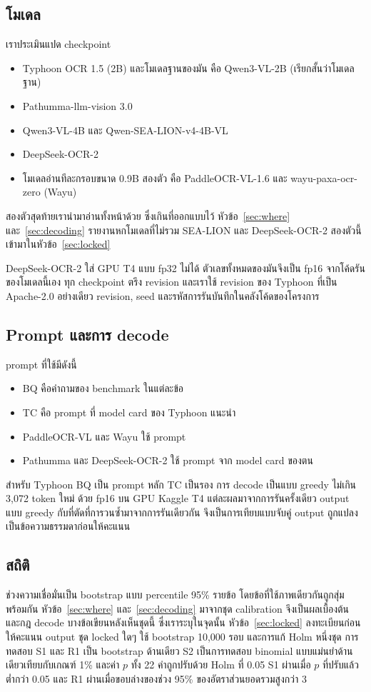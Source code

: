 \subsection{โมเดล}
เราประเมินแปด checkpoint
\begin{itemize}
\item Typhoon OCR 1.5 (2B) และโมเดลฐานของมัน คือ Qwen3-VL-2B (เรียกสั้นว่าโมเดลฐาน)
\item Pathumma-llm-vision 3.0
\item Qwen3-VL-4B และ Qwen-SEA-LION-v4-4B-VL \cite{aisingapore2026sealion}
\item DeepSeek-OCR-2 \cite{wei2026deepseekocr2}
\item โมเดลอ่านทีละกรอบขนาด 0.9B สองตัว คือ PaddleOCR-VL-1.6 และ wayu-paxa-ocr-zero (Wayu)
\end{itemize}
สองตัวสุดท้ายเรานำมาอ่านทั้งหน้าด้วย ซึ่งเกินที่ออกแบบไว้ หัวข้อ~\ref{sec:where} และ~\ref{sec:decoding} รายงานหกโมเดลที่ไม่รวม SEA-LION และ DeepSeek-OCR-2 สองตัวนี้เข้ามาในหัวข้อ~\ref{sec:locked}

DeepSeek-OCR-2 ใส่ GPU T4 แบบ fp32 ไม่ได้ ตัวเลขทั้งหมดของมันจึงเป็น fp16 จากโค้ดรันของโมเดลนี้เอง ทุก checkpoint ตรึง revision และเราใช้ revision ของ Typhoon ที่เป็น Apache-2.0 อย่างเดียว revision, seed และรหัสการรันบันทึกในคลังโค้ดของโครงการ

\subsection{Prompt และการ decode}
prompt ที่ใช้มีดังนี้
\begin{itemize}
\item BQ คือคำถามของ benchmark ในแต่ละข้อ
\item TC คือ prompt ที่ model card ของ Typhoon แนะนำ
\item PaddleOCR-VL และ Wayu ใช้ prompt 
\item Pathumma และ DeepSeek-OCR-2 ใช้ prompt จาก model card ของตน
\end{itemize}
สำหรับ Typhoon BQ เป็น prompt หลัก TC เป็นรอง การ decode เป็นแบบ greedy ไม่เกิน 3,072 token ใหม่ ด้วย fp16 บน GPU Kaggle T4 แต่ละผลมาจากการรันครั้งเดียว output แบบ greedy กับที่ตัดที่การวนซ้ำมาจากการรันเดียวกัน จึงเป็นการเทียบแบบจับคู่ output ถูกแปลงเป็นข้อความธรรมดาก่อนให้คะแนน

\subsection{สถิติ}
ช่วงความเชื่อมั่นเป็น bootstrap แบบ percentile 95\% รายข้อ โดยข้อที่ใช้ภาพเดียวกันถูกสุ่มพร้อมกัน หัวข้อ~\ref{sec:where} และ~\ref{sec:decoding} มาจากชุด calibration จึงเป็นผลเบื้องต้น และกฎ decode บางข้อเขียนหลังเห็นชุดนี้ ซึ่งเราระบุในจุดนั้น หัวข้อ~\ref{sec:locked} ลงทะเบียนก่อนให้คะแนน output ชุด locked ใดๆ ใช้ bootstrap 10,000 รอบ และการแก้ Holm หนึ่งชุด การทดสอบ S1 และ R1 เป็น bootstrap ด้านเดียว S2 เป็นการทดสอบ binomial แบบแม่นยำด้านเดียวเทียบกับเกณฑ์ 1\% และค่า $p$ ทั้ง 22 ค่าถูกปรับด้วย Holm ที่ 0.05 S1 ผ่านเมื่อ $p$ ที่ปรับแล้วต่ำกว่า 0.05 และ R1 ผ่านเมื่อขอบล่างของช่วง 95\% ของอัตราส่วนยอดรวมสูงกว่า 3

